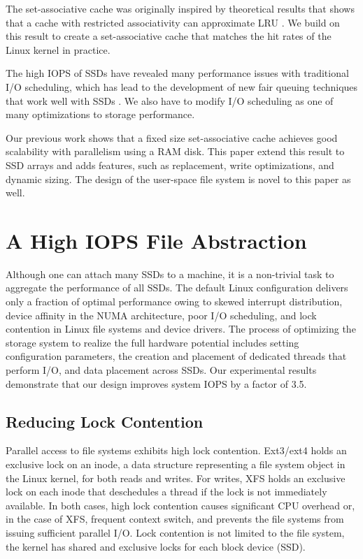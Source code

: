 The set-associative cache  was originally inspired by theoretical results 
that shows that a cache with restricted associativity can approximate LRU \cite{Sen02}.
We build on this result to create a set-associative cache that matches the 
hit rates of the Linux kernel in practice.

The high IOPS of SSDs have revealed many performance issues with 
traditional I/O scheduling, which has lead to the development of 
new fair queuing techniques that work well with SSDs \cite{Park12}.
We also have to modify I/O scheduling as one of many optimizations to 
storage performance.

Our previous work \cite{hotstorage12} shows that a fixed size set-associative cache
achieves good scalability with parallelism using a RAM disk.
This paper extend this result to SSD arrays and adds features, such as replacement,
write optimizations, and dynamic sizing.  The design of the user-space file system
is novel to this paper as well.

\section{A High IOPS File Abstraction}

Although one can attach many SSDs to a machine, 
it is a non-trivial task to  aggregate the performance of all SSDs.
The default Linux configuration delivers only a fraction of optimal
performance owing to skewed interrupt distribution, device affinity
in the NUMA architecture, poor I/O scheduling, and lock contention
in Linux file systems and device drivers.
The process of optimizing the storage system to realize the 
full hardware potential includes setting configuration parameters,
the creation and placement of dedicated threads that perform I/O,
and data placement across SSDs.  
Our experimental results demonstrate that our design
improves system IOPS by a factor of 3.5.

\subsection{Reducing Lock Contention}

Parallel access to file systems exhibits high lock contention. 
Ext3/ext4 holds an exclusive lock on an inode, a data structure
representing a file system object in the Linux kernel, for both reads and
writes.  For writes, XFS holds an exclusive lock on each inode that 
deschedules a thread if the lock is not immediately available. 
In both cases, high lock contention causes significant CPU overhead or,
in the case of XFS, frequent context switch, and prevents the file systems
from issuing sufficient parallel I/O.
Lock contention is not limited to the file system, the kernel has
shared and exclusive locks for each block device (SSD).

